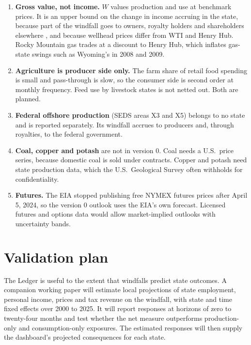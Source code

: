\documentclass[11pt]{article}
\begin{document}
\begin{enumerate}[leftmargin=1.4em]
  \item \textbf{Gross value, not income.} $W$ values production and use at benchmark
  prices. It is an upper bound on the change in income accruing in the state, because part
  of the windfall goes to owners, royalty holders and shareholders elsewhere
  \citep{feyrer2017}, and because wellhead prices differ from WTI and Henry Hub. Rocky
  Mountain gas trades at a discount to Henry Hub, which inflates gas-state swings such as
  Wyoming's in 2008 and 2009.
  \item \textbf{Agriculture is producer side only.} The farm share of retail food spending
  is small and pass-through is slow, so the consumer side is second order at monthly
  frequency. Feed use by livestock states is not netted out. Both are planned.
  \item \textbf{Federal offshore production} (SEDS areas X3 and X5) belongs to no state and
  is reported separately. Its windfall accrues to producers and, through royalties, to the
  federal government.
  \item \textbf{Coal, copper and potash} are not in version 0. Coal needs a U.S.\ price
  series, because domestic coal is sold under contracts. Copper and potash need state
  production data, which the U.S.\ Geological Survey often withholds for confidentiality.
  \item \textbf{Futures.} The EIA stopped publishing free NYMEX futures prices after April
  5, 2024, so the version 0 outlook uses the EIA's own forecast. Licensed futures and options
  data would allow market-implied outlooks with uncertainty bands.
\end{enumerate}

\section{Validation plan}

The Ledger is useful to the extent that windfalls predict state outcomes. A companion
working paper will estimate local projections \citep{jorda2005} of state employment,
personal income, prices and tax revenue on the windfall, with state and time fixed effects
over 2000 to 2025. It will report responses at horizons of zero to twenty-four months and
test whether the net measure outperforms production-only and consumption-only exposures.
The estimated responses will then supply the dashboard's projected consequences for each
state.
\end{document}
